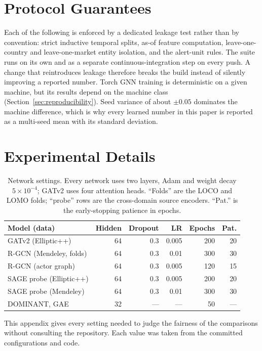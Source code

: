 \documentclass[conference]{IEEEtran}
\begin{document}
\section{Protocol Guarantees}

Each of the following is enforced by a dedicated leakage test rather than by
convention: strict inductive temporal splits, as-of feature computation,
leave-one-country and leave-one-market entity isolation, and the alert-unit
rules. The suite runs on its own and as a separate continuous-integration step
on every push. A change that reintroduces leakage therefore breaks the build instead
of silently improving a reported number. Torch GNN training is deterministic on
a given machine, but its results depend on the machine class
(Section~\ref{sec:reproducibility}). Seed variance of about $\pm 0.05$
dominates the machine difference, which is why every learned number in this
paper is reported as a multi-seed mean with its standard deviation.

\section{Experimental Details}
\label{app:methods}

\begin{table}[t]
\caption{Network settings. Every network uses two layers, Adam and weight decay
$5 \times 10^{-4}$; GATv2 uses four attention heads. ``Folds'' are the LOCO
and LOMO folds; ``probe'' rows are the cross-domain source encoders. ``Pat.''
is the early-stopping patience in epochs.}
\label{tab:hparams}
\centering
\footnotesize
\setlength{\tabcolsep}{3pt}
\begin{tabular}{lrrrrr}
\toprule
Model (data) & Hidden & Dropout & LR & Epochs & Pat. \\
\midrule
GATv2 (Elliptic++) & 64 & 0.3 & 0.005 & 200 & 20 \\
R-GCN (Mendeley, folds) & 64 & 0.3 & 0.01 & 300 & 30 \\
R-GCN (actor graph) & 64 & 0.3 & 0.005 & 120 & 15 \\
SAGE probe (Elliptic++) & 64 & 0.3 & 0.005 & 200 & 20 \\
SAGE probe (Mendeley) & 64 & 0.3 & 0.01 & 300 & 30 \\
DOMINANT, GAE & 32 & --- & --- & 50 & --- \\
\bottomrule
\end{tabular}
\end{table}

This appendix gives every setting needed to judge the fairness of the
comparisons without consulting the repository. Each value was taken from the
committed configurations and code.
\end{document}
